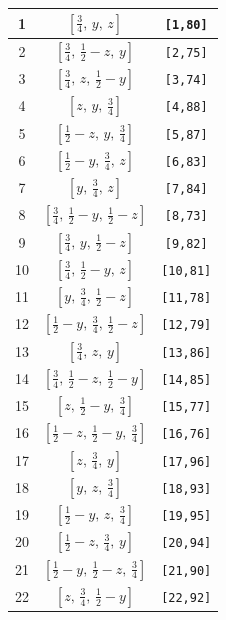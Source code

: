 \documentclass[fleqn,8pt]{jsarticle}
\begin{document}
\begin{longtable}{ccc}
1 & $\left[ \frac{3}{4},\, y,\, z \right]$ & {\tt [1,80]} \\ \hline
2 & $\left[ \frac{3}{4},\, \frac{1}{2} - z,\, y \right]$ & {\tt [2,75]} \\ \hline
3 & $\left[ \frac{3}{4},\, z,\, \frac{1}{2} - y \right]$ & {\tt [3,74]} \\ \hline
4 & $\left[ z,\, y,\, \frac{3}{4} \right]$ & {\tt [4,88]} \\ \hline
5 & $\left[ \frac{1}{2} - z,\, y,\, \frac{3}{4} \right]$ & {\tt [5,87]} \\ \hline
6 & $\left[ \frac{1}{2} - y,\, \frac{3}{4},\, z \right]$ & {\tt [6,83]} \\ \hline
7 & $\left[ y,\, \frac{3}{4},\, z \right]$ & {\tt [7,84]} \\ \hline
8 & $\left[ \frac{3}{4},\, \frac{1}{2} - y,\, \frac{1}{2} - z \right]$ & {\tt [8,73]} \\ \hline
9 & $\left[ \frac{3}{4},\, y,\, \frac{1}{2} - z \right]$ & {\tt [9,82]} \\ \hline
10 & $\left[ \frac{3}{4},\, \frac{1}{2} - y,\, z \right]$ & {\tt [10,81]} \\ \hline
11 & $\left[ y,\, \frac{3}{4},\, \frac{1}{2} - z \right]$ & {\tt [11,78]} \\ \hline
12 & $\left[ \frac{1}{2} - y,\, \frac{3}{4},\, \frac{1}{2} - z \right]$ & {\tt [12,79]} \\ \hline
13 & $\left[ \frac{3}{4},\, z,\, y \right]$ & {\tt [13,86]} \\ \hline
14 & $\left[ \frac{3}{4},\, \frac{1}{2} - z,\, \frac{1}{2} - y \right]$ & {\tt [14,85]} \\ \hline
15 & $\left[ z,\, \frac{1}{2} - y,\, \frac{3}{4} \right]$ & {\tt [15,77]} \\ \hline
16 & $\left[ \frac{1}{2} - z,\, \frac{1}{2} - y,\, \frac{3}{4} \right]$ & {\tt [16,76]} \\ \hline
17 & $\left[ z,\, \frac{3}{4},\, y \right]$ & {\tt [17,96]} \\ \hline
18 & $\left[ y,\, z,\, \frac{3}{4} \right]$ & {\tt [18,93]} \\ \hline
19 & $\left[ \frac{1}{2} - y,\, z,\, \frac{3}{4} \right]$ & {\tt [19,95]} \\ \hline
20 & $\left[ \frac{1}{2} - z,\, \frac{3}{4},\, y \right]$ & {\tt [20,94]} \\ \hline
21 & $\left[ \frac{1}{2} - y,\, \frac{1}{2} - z,\, \frac{3}{4} \right]$ & {\tt [21,90]} \\ \hline
22 & $\left[ z,\, \frac{3}{4},\, \frac{1}{2} - y \right]$ & {\tt [22,92]} \\ \hline

\end{longtable}
\end{document}
